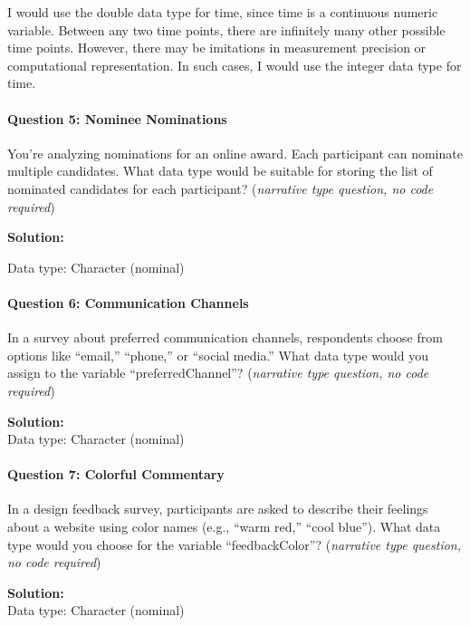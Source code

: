 \documentclass[
]{article}
\begin{document}
I would use the double data type for time, since time is a continuous
numeric variable. Between any two time points, there are infinitely many
other possible time points. However, there may be imitations in
measurement precision or computational representation. In such cases, I
would use the integer data type for time.

\hypertarget{question-5-nominee-nominations}{%
\paragraph{Question 5: Nominee
Nominations}\label{question-5-nominee-nominations}}

You're analyzing nominations for an online award. Each participant can
nominate multiple candidates. What data type would be suitable for
storing the list of nominated candidates for each participant?
(\emph{narrative type question, no code required})

\textbf{Solution:}

Data type: Character (nominal)

\hypertarget{question-6-communication-channels}{%
\paragraph{Question 6: Communication
Channels}\label{question-6-communication-channels}}

In a survey about preferred communication channels, respondents choose
from options like ``email,'' ``phone,'' or ``social media.'' What data
type would you assign to the variable ``preferredChannel''?
(\emph{narrative type question, no code required})

\textbf{Solution:}\\
Data type: Character (nominal)

\hypertarget{question-7-colorful-commentary}{%
\paragraph{Question 7: Colorful
Commentary}\label{question-7-colorful-commentary}}

In a design feedback survey, participants are asked to describe their
feelings about a website using color names (e.g., ``warm red,'' ``cool
blue''). What data type would you choose for the variable
``feedbackColor''? (\emph{narrative type question, no code required})

\textbf{Solution:}\\
Data type: Character (nominal)
\end{document}
